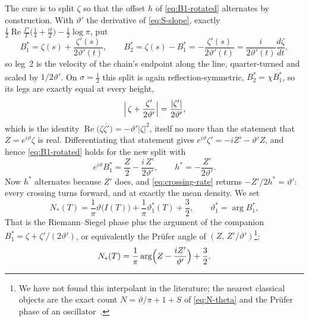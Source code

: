 \documentclass[11pt]{article}
\theoremstyle{definition}
\begin{document}
The cure is to split $\zeta$ so that the offset $h$ of \eqref{eq:B1-rotated}
alternates by construction. With $\vartheta'$ the derivative of \eqref{eq:S-slope}, exactly
$\tfrac12\operatorname{Re}\tfrac{\Gamma'}{\Gamma}\bigl(\tfrac14+\tfrac{it}{2}\bigr)-\tfrac12\log\pi$,
put
\begin{equation}\label{eq:vel-split}
B_1^{\ast}=\zeta(s)+\frac{\zeta'(s)}{2\vartheta'(t)},\qquad
B_2^{\ast}=\zeta(s)-B_1^{\ast}=-\frac{\zeta'(s)}{2\vartheta'(t)}
=\frac{i}{2\vartheta'(t)}\frac{d\zeta}{dt},
\end{equation}
so leg~2 is the velocity of the chain's endpoint along the line, quarter-turned
and scaled by $1/2\vartheta'$. On $\sigma=\tfrac12$ this split is again
reflection-symmetric, $B_2^{\ast}=\chi\overline{B_1^{\ast}}$, so its legs are
exactly equal at every height,
\begin{equation}\label{eq:vel-legs}
\Bigl|\,\zeta+\frac{\zeta'}{2\vartheta'}\Bigr|=\frac{|\zeta'|}{2\vartheta'},
\end{equation}
which is the identity $\operatorname{Re}\bigl(\zeta\overline{\zeta'}\bigr)
=-\vartheta'|\zeta|^{2}$, itself no more than the statement that
$Z=e^{i\vartheta}\zeta$ is real. Differentiating that statement gives
$e^{i\vartheta}\zeta'=-iZ'-\vartheta'Z$, and hence \eqref{eq:B1-rotated} holds for the
new split with
\begin{equation}\label{eq:h-star}
e^{i\vartheta}B_1^{\ast}=\frac{Z}{2}-\frac{i\,Z'}{2\vartheta'},
\qquad h^{\ast}=-\frac{Z'}{2\vartheta'} .
\end{equation}
Now $h^{\ast}$ alternates because $Z'$ does, and \eqref{eq:crossing-rate}
returns $-Z'/2h^{\ast}=\vartheta'$: every crossing turns forward, and at exactly
the mean density. We set
\begin{equation}\label{eq:N-star}
N_{\ast}(T)=\frac{1}{\pi}\vartheta\bigl(I(T)\bigr)
+\frac{1}{\pi}\vartheta_1^{\ast}(T)+\frac32,
\qquad \vartheta_1^{\ast}=\arg B_1^{\ast},
\end{equation}
That is the Riemann--Siegel phase plus the argument of the companion
$B_1^{\ast}=\zeta+\zeta'/(2\vartheta')$, or equivalently the Pr\"ufer angle
of $(Z,\,Z'/\vartheta')$\footnote{We have not found this interpolant in the
literature; the nearest classical objects are the exact count
$N=\vartheta/\pi+1+S$ of \eqref{eq:N-theta} and the Pr\"ufer phase of an
oscillator~\cite{Prufer1926}.}:
\begin{equation}\label{eq:N-star-prufer}
N_{\ast}(T)
=\frac{1}{\pi}\arg\Bigl(Z-\frac{iZ'}{\vartheta'}\Bigr)+\frac32.
\end{equation}
\end{document}
